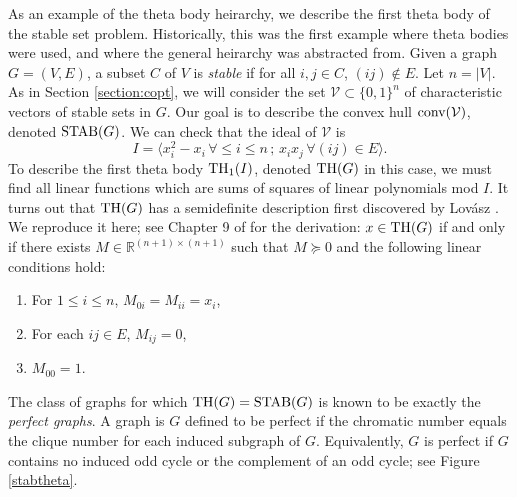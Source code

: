 As an example of the theta body heirarchy, we describe the first theta body of the stable set problem.
Historically, this was the first example where theta bodies were used, and where the general heirarchy was abstracted from.
Given a graph $G=(V,E)$, a subset $C$ of $V$ is {\em stable} if for all $i,j \in C$, $(ij) \notin E$. 
Let $n = |V|$.
As in Section \ref{section:copt}, we will consider the set $\mathcal{V} \subset \{0,1\}^n$ of characteristic vectors of stable sets in $G$.
Our goal is to describe the convex hull $\hbox{conv}(\mathcal{V})$, denoted $\textup{STAB}(G)$.
We can check that the ideal of $\mathcal{V}$ is 
$$I = \langle x_i^2 - x_i \, \forall \le i \le n\, ;\,  x_ix_j \, \forall (ij) \in E \rangle.$$
To describe the first theta body $\textup{TH}_1(I)$, denoted $\textup{TH}(G)$ in this case, we must find all linear functions which are sums of squares of linear polynomials mod $I$.
It turns out that $\textup{TH}(G)$ has a semidefinite description first discovered by Lov\'asz \cite{lovasz}.
We reproduce it here; see Chapter 9 of \cite{gls} for the derivation: $x \in \textup{TH}(G)$ if and only if there exists $M \in \mathbb{R}^{(n + 1) \times (n + 1)}$
such that $M \succeq 0$ and the following linear conditions hold:
\begin{enumerate}
\item For $1 \le i \le n$, $M_{0i} = M_{ii} = x_i$,
\item For each $ij \in E$, $M_{ij} = 0$,
\item $M_{00} = 1$.
\end{enumerate}

The class of graphs for which $\textup{TH}(G) = \textup{STAB}(G)$ is known to be exactly the {\em perfect graphs}.
A graph is $G$ defined to be perfect if the chromatic number equals the clique number for each induced subgraph of $G$.
Equivalently, $G$ is perfect if $G$ contains no induced odd cycle or the complement of an odd cycle; see Figure \ref{stabtheta}.

